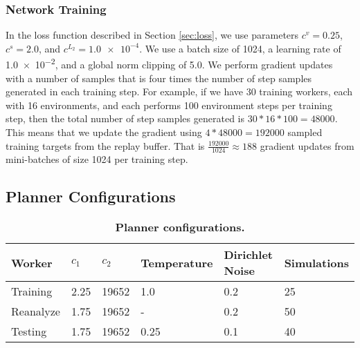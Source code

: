 \subsubsection{Network Training}
In the loss function described in Section \ref{sec:loss}, we use parameters $c^v = 0.25$, $c^s = 2.0$, and $c^{L_2} = \num{1.0e-4}$.
We use a batch size of 1024, a learning rate of \num{1.0e-2}, and a global norm clipping of \num{5.0}.
We perform gradient updates with a number of samples that is four times the number of step samples generated in each training step.
For example, if we have 30 training workers, each with 16 environments, and each performs 100 environment steps per training step, then the total number of step samples generated is $30 * 16 * 100 = 48000$.
This means that we update the gradient using $4 * 48000 = 192000$ sampled training targets from the replay buffer.
That is $\frac{192000}{1024} \approx 188$ gradient updates from mini-batches of size 1024 per training step.

\subsection{Planner Configurations} \label{sec:planner_config}
\begin{table}
    \begin{tabular}{@{}|l|l|l|l|l|l|@{}}
        \toprule
        Worker    & $c_1$ & $c_2$ & Temperature & Dirichlet Noise & Simulations \\ \midrule
        Training  & 2.25  & 19652 & 1.0         & 0.2             & 25          \\ \midrule
        Reanalyze & 1.75  & 19652 & -           & 0.2             & 50          \\ \midrule
        Testing   & 1.75  & 19652 & 0.25        & 0.1             & 40          \\ \bottomrule
    \end{tabular}
    \captionsetup{width=\linewidth, justification=raggedright}
    \caption[Planner Configuration]{\textbf{Planner configurations.}}
    \label{tb:planner_args}
\end{table}

